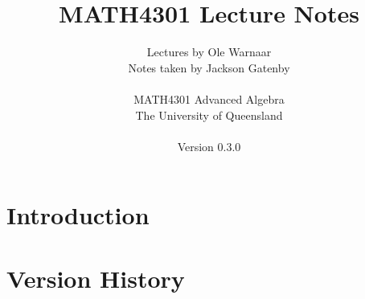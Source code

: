\documentclass[a4paper]{report}
\title{MATH4301 Lecture Notes}
\author{Lectures by Ole Warnaar\\
Notes taken by Jackson Gatenby\\
\\
MATH4301 Advanced Algebra\\
The University of Queensland\\
\\
Version 0.3.0}
\begin{document}
\maketitle
\tableofcontents



\chapter{Introduction}





\appendix

\chapter{Version History}

\end{document}
